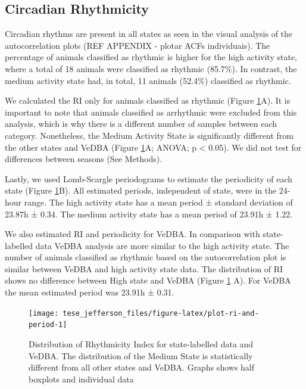 \documentclass[english,msc,numbers,hidelinks]{coppe}
\begin{document}
  \hypertarget{circadian-rhythmicity}{%
  \subsection{Circadian Rhythmicity}\label{circadian-rhythmicity}}

  Circadian rhythms are present in all states as seen in the visual analysis of the autocorrelation plots (REF APPENDIX - plotar ACFs individuais). The percentage of animals classified as rhythmic is higher for the high activity state, where a total of 18 animals were classified as rhythmic (85.7\%). In contrast, the medium activity state had, in total, 11 animals (52.4\%) classified as rhythmic.

  We calculated the RI only for animals classified as rhythmic (Figure \ref{fig:plot-ri-and-period}A). It is important to note that animals classified as arrhythmic were excluded from this analysis, which is why there is a different number of samples between each category. Nonetheless, the Medium Activity State is significantly different from the other states and VeDBA (Figure \ref{fig:plot-ri-and-period}A; ANOVA; p \textless{} 0.05). We did not test for differences between seasons (See Methods).

  Lastly, we used Lomb-Scargle periodograms to estimate the periodicity of each state (Figure \ref{fig:plot-ri-and-period}B). All estimated periods, independent of state, were in the 24-hour range. The high activity state has a mean period ± standard deviation of 23.87h ± 0.34. The medium activity state has a mean period of 23.91h ± 1.22.

  We also estimated RI and periodicity for VeDBA. In comparison with state-labelled data VeDBA analysis are more similar to the high activity state. The number of animals classified as rhythmic based on the autocorrelation plot is similar between VeDBA and high activity state data. The distribution of RI shows no difference between High state and VeDBA (Figure \ref{fig:plot-ri-and-period} A). For VeDBA the mean estimated period was 23.91h ± 0.31.
  \begin{figure}[H]

  {\centering \texttt{[image: tese\_jefferson\_files/figure-latex/plot-ri-and-period-1]} 

  }

  \caption{Distribution of Rhythmicity Index for state-labelled data and VeDBA. The distribution of the Medium State is statistically different from all other states and VeDBA. Graphs shows half boxplots and individual data}\label{fig:plot-ri-and-period}
  \end{figure}
  \newpage
\end{document}

